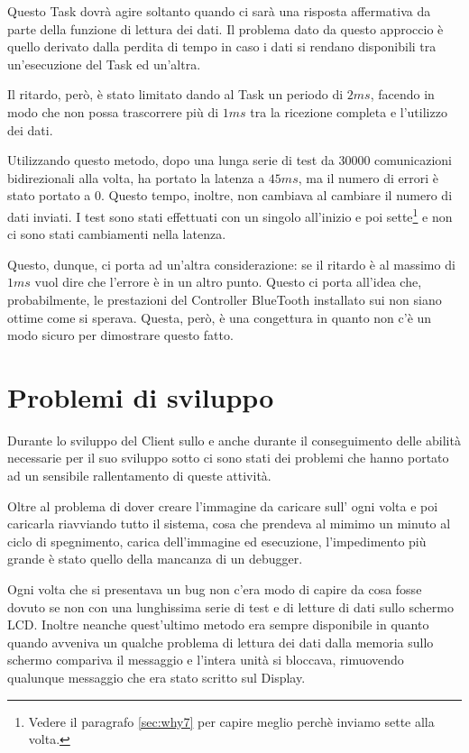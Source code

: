 Questo Task dovrà agire soltanto quando ci sarà una risposta affermativa da
parte della funzione di lettura dei dati. Il problema dato da questo
approccio è quello derivato dalla perdita di tempo in caso i dati si
rendano disponibili tra un'esecuzione del Task ed un'altra.

Il ritardo, però, è stato limitato dando al Task un periodo di $2ms$,
facendo in modo che non possa trascorrere più di $1ms$ tra la ricezione
completa e l'utilizzo dei dati.

Utilizzando questo metodo, dopo una lunga serie di test da $30000$
comunicazioni bidirezionali alla volta, ha portato la latenza a $45ms$, ma
il numero di errori è stato portato a $0$. Questo tempo, inoltre, non
cambiava al cambiare il numero di dati inviati. I test sono stati
effettuati con un singolo \BROFist{} all'inizio e poi sette\footnote{Vedere
il paragrafo \ref{sec:why7} per capire meglio perchè inviamo sette
\BROFist{} alla volta.} e non ci sono stati cambiamenti nella latenza.

Questo, dunque, ci porta ad un'altra considerazione: se il ritardo è al
massimo di $1ms$ vuol dire che l'errore è in un altro punto. Questo ci
porta all'idea che, probabilmente, le prestazioni del Controller BlueTooth
installato sui \nxt{} non siano ottime come si sperava. Questa, però, è una
congettura in quanto non c'è un modo sicuro per dimostrare questo fatto.

\section{Problemi di sviluppo}
Durante lo sviluppo del Client sullo \SPAM{} e anche durante il
conseguimento delle abilità necessarie per il suo sviluppo sotto
\nxtOSEK{} ci sono stati dei problemi che hanno portato ad un sensibile
rallentamento di queste attività.

Oltre al problema di dover creare l'immagine da caricare sull'\nxt{} ogni
volta e poi caricarla riavviando tutto il sistema, cosa che prendeva al
mimimo un minuto al ciclo di spegnimento, carica dell'immagine ed
esecuzione, l'impedimento più grande è stato quello della mancanza di un
debugger.

Ogni volta che si presentava un bug non c'era modo di capire da cosa fosse
dovuto se non con una lunghissima serie di test e di letture di dati sullo
schermo LCD. Inoltre neanche quest'ultimo metodo era sempre disponibile in
quanto quando avveniva un qualche problema di lettura dei dati dalla
memoria sullo schermo compariva il messaggio  e l'intera
unità si bloccava, rimuovendo qualunque messaggio che era stato scritto
sul Display.

\cleardoublepage
